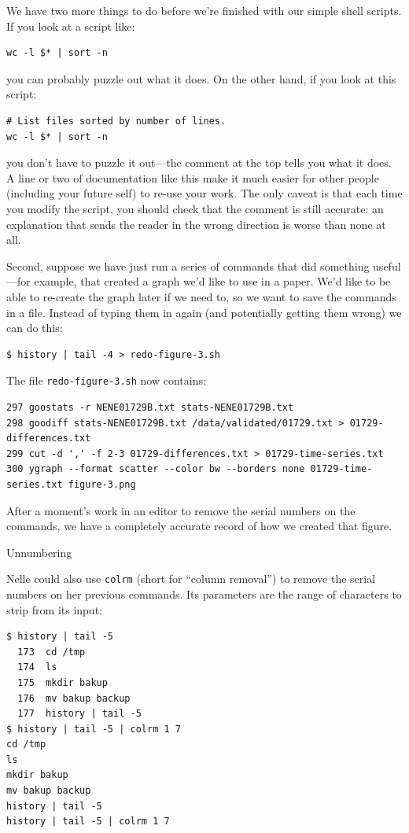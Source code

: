 \documentclass{book}
\begin{document}
We have two more things to do before we're finished with our simple
shell scripts. If you look at a script like:

\begin{verbatim}
wc -l $* | sort -n
\end{verbatim}

you can probably puzzle out what it does. On the other hand, if you look
at this script:

\begin{verbatim}
# List files sorted by number of lines.
wc -l $* | sort -n
\end{verbatim}

you don't have to puzzle it out---the comment at the top tells you what
it does. A line or two of documentation like this make it much easier
for other people (including your future self) to re-use your work. The
only caveat is that each time you modify the script, you should check
that the comment is still accurate: an explanation that sends the reader
in the wrong direction is worse than none at all.

Second, suppose we have just run a series of commands that did something
useful---for example, that created a graph we'd like to use in a paper.
We'd like to be able to re-create the graph later if we need to, so we
want to save the commands in a file. Instead of typing them in again
(and potentially getting them wrong) we can do this:

\begin{verbatim}
$ history | tail -4 > redo-figure-3.sh
\end{verbatim}

The file \texttt{redo-figure-3.sh} now contains:

\begin{verbatim}
297 goostats -r NENE01729B.txt stats-NENE01729B.txt
298 goodiff stats-NENE01729B.txt /data/validated/01729.txt > 01729-differences.txt
299 cut -d ',' -f 2-3 01729-differences.txt > 01729-time-series.txt
300 ygraph --format scatter --color bw --borders none 01729-time-series.txt figure-3.png
\end{verbatim}

After a moment's work in an editor to remove the serial numbers on the
commands, we have a completely accurate record of how we created that
figure.

\begin{swcbox}{Unnumbering}

Nelle could also use \texttt{colrm} (short for ``column removal'') to
remove the serial numbers on her previous commands. Its parameters are
the range of characters to strip from its input:

\begin{verbatim}
$ history | tail -5
  173  cd /tmp
  174  ls
  175  mkdir bakup
  176  mv bakup backup
  177  history | tail -5
$ history | tail -5 | colrm 1 7
cd /tmp
ls
mkdir bakup
mv bakup backup
history | tail -5
history | tail -5 | colrm 1 7
\end{verbatim}

\end{swcbox}
\end{document}
